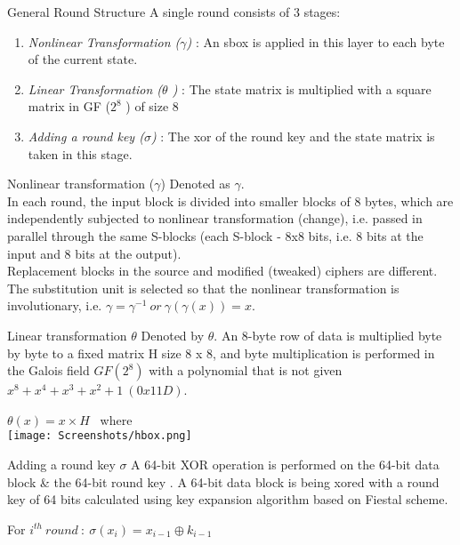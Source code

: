 \begin{frame}{General Round Structure}
    A single round consists of 3 stages:\\ 
    \begin{enumerate}
        \item \textit{Nonlinear Transformation ($\gamma$)} : An sbox is applied in this layer to each byte of the current state.  
        \item \textit{Linear Transformation ($\theta$ )} : The state matrix is multiplied with a square matrix in GF ($2^8$ ) of size 8
        \item \textit{Adding a round key ($\sigma$)} : The xor of the round key and the state matrix is taken in this stage.
    \end{enumerate}
\end{frame}

\begin{frame}{Nonlinear transformation ($\gamma$)}
    Denoted as $\gamma$.\\
    In each round, the input block is divided into smaller blocks of 8 bytes, which are independently subjected to nonlinear transformation (change), i.e. passed in parallel through the same S-blocks (each S-block - 8x8 bits, i.e. 8 bits at the input and 8 bits at the output).\\ 
    Replacement blocks in the source and modified (tweaked) ciphers are different. The substitution unit is selected so that the nonlinear transformation is involutionary, i.e. $\gamma = \gamma^{-1} \ or \ \gamma(\gamma(x)) = x.$
\end{frame}

\begin{frame}{Linear transformation $\theta$}
     Denoted by $\theta$. An 8-byte row of data is multiplied byte by byte to a fixed matrix H size 8 x 8, and byte multiplication is performed in the Galois field $GF(2^{8})$ with a polynomial that is not given $x^{8} + x^{4} + x^{3} + x^{2} +1 \ (0x11D)$.\\
    \begin{center}
        $\theta (x) = x \times H$ \ where\\ 
        \texttt{[image: Screenshots/hbox.png]}
    \end{center}
    
\end{frame}

\begin{frame}{Adding a round key $\sigma$}
    A 64-bit XOR operation is performed on the 64-bit data block \& the 64-bit round key .
    A 64-bit data block is being xored with a round key of 64 bits calculated using key expansion algorithm based on Fiestal scheme.\\
   \begin{center}
       For $i^{th} \ round \ : \ \sigma (x_i) = x_{i-1} \oplus k_{i-1}$
   \end{center} 
\end{frame}

